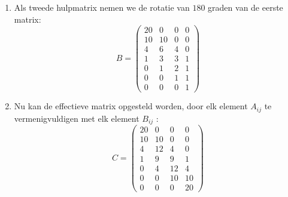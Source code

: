 \begin{itemize}
{\begin{itemize}
\begin{enumerate}
				\item Als tweede hulpmatrix nemen we de rotatie van $180$ graden van de eerste matrix:
				$$
				B = 
				\begin{pmatrix}
					20 & 0  & 0 & 0 \\ 
					10 & 10 & 0 & 0 \\ 
					4  & 6  & 4 & 0 \\ 
					1  & 3  & 3 & 1 \\ 
					0  & 1  & 2 & 1 \\ 
					0  & 0  & 1 & 1 \\ 
					0  & 0  & 0 & 1 
				\end{pmatrix}
				$$
				\item Nu kan de effectieve matrix opgesteld worden, door elk element $A_{ij}$ te vermenigvuldigen met elk element $B_{ij}$ :
				$$
				C =
				\begin{pmatrix}
					20 & 0  & 0  & 0  \\ 
					10 & 10 & 0  & 0  \\ 
					4  & 12 & 4  & 0  \\ 
					1  & 9  & 9  & 1  \\ 
					0  & 4  & 12 & 4  \\ 
					0  & 0  & 10 & 10 \\ 
					0  & 0  & 0  & 20 
				\end{pmatrix}
				$$
			\end{enumerate}
		

\end{itemize}}
\end{itemize}
